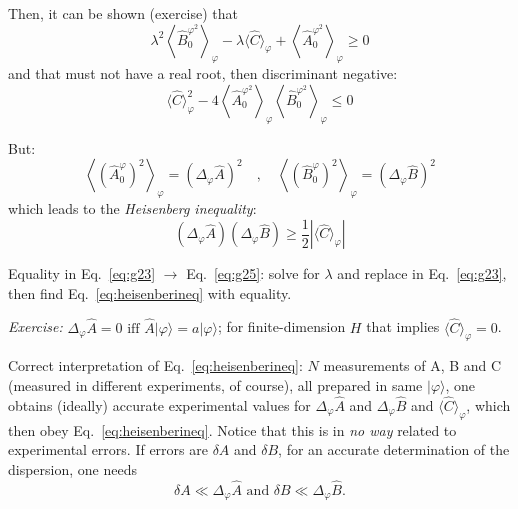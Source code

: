 \documentclass[12pt]{article}
\begin{document}
\begin{enumerate}
%
Then, it can be shown (exercise) that
\begin{equation}
\lambda^{2}\left\langle\hat{B}_{0}^{\varphi^2}\right\rangle_{\varphi}-
\lambda\langle\hat{C}\rangle_{\varphi}+
\left\langle\hat{A}_{0}^{\varphi^{2}}\right\rangle_{\varphi} \geqslant 0
\label{eq:g24}
\end{equation}
and that must not have a real root, then discriminant negative:
\begin{equation}
\langle\hat{C}\rangle_{\varphi}^{2}-4
\left\langle\hat{A}_{0}^{\varphi^{2}}\right\rangle_{\varphi}
\left\langle\hat{B}_{0}^{\varphi^{2}}\right\rangle_{\varphi} \leqslant 0
\label{eq:g25}
\end{equation}
%
\end{enumerate}

But:
\begin{equation}
\left\langle\left(\hat{A}_{0}^{\varphi}\right)^{2}\right\rangle_{\varphi}
=\left(\Delta_{\varphi} \hat{A}\right)^{2}
\quad,\quad
\left\langle\left(\hat{B}_{0}^{\varphi}\right)^{2}\right\rangle_{\varphi}
=\left(\Delta_{\varphi} \hat{B}\right)^{2}
\end{equation}
which leads to the \emph{Heisenberg inequality}:
\begin{equation}
\boxed{
\left(\Delta_{\varphi} \hat{A}\right)\left(\Delta_{\varphi} \hat{B}\right) \geqslant \frac{1}{2}\left|\langle\hat{C}\rangle_{\varphi}\right|
}
\label{eq:heisenberineq}
\end{equation}

Equality in Eq.~\ref{eq:g23} $\to$ Eq.~\ref{eq:g25}: solve for $\lambda$ and replace in Eq.~\ref{eq:g23},
then find Eq.~\ref{eq:heisenberineq} with equality.

\emph{Exercise:} 
$\Delta_\varphi \hat{A}=0 \textrm{ iff } \hat{A}|\varphi\rangle=a|\varphi\rangle$; 
for finite-dimension $H$ that implies 
$\langle\hat{C}\rangle_{\varphi}=0$.

Correct interpretation of Eq.~\ref{eq:heisenberineq}:
$N$ measurements of A, B and C (measured in different
experiments, of course), all prepared in same $|\varphi\rangle$,
one obtains (ideally) accurate experimental values for 
$\Delta_{\varphi} \hat{A}$ and 
$\Delta_{\varphi} \hat{B}$ and
$\langle\hat{C}\rangle_{\varphi}$,
which then obey Eq.~\ref{eq:heisenberineq}. 
Notice that this is in \emph{no way} related to experimental errors.
If errors are $\delta A$ and $\delta B$, for an accurate
determination of the dispersion, one needs
\begin{equation}
\delta A \ll \Delta_{\varphi} \hat{A} \textrm { and } \delta B \ll \Delta_{\varphi} \hat{B}.
\end{equation}
\end{document}
